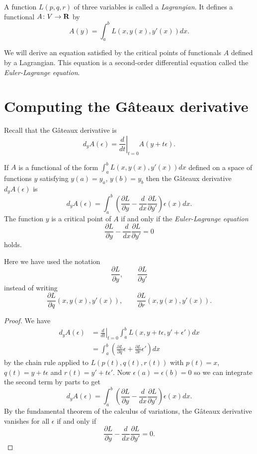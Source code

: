 \begin{dfn}
A function $L(p,q,r)$ of three variables is called a {\em Lagrangian}. It defines a functional $A\colon V\to\mathbf{R}$ by
\[A(y)=\int_a^bL(x,y(x),y'(x))dx.\]
\end{dfn}

We will derive an equation satisfied by the critical points of functionals $A$ defined by a Lagrangian. This equation is a second-order differential equation called the {\em Euler-Lagrange equation}.

\section{Computing the G\^{a}teaux derivative}

Recall that the G\^{a}teaux derivative is
\[d_yA(\epsilon)=\left.\frac{d}{dt}\right|_{t=0}A(y+t\epsilon).\]
\begin{thm}
If $A$ is a functional of the form $\int_a^bL(x,y(x),y'(x))dx$ defined on a space of functions $y$ satisfying $y(a)=y_a$, $y(b)=y_b$ then the G\^{a}teaux derivative $d_yA(\epsilon)$ is
\[d_yA(\epsilon)=\int_a^b\left(\frac{\partial L}{\partial y}-\frac{d}{dx}\frac{\partial L}{\partial y'}\right)\epsilon(x)dx.\]
The function $y$ is a critical point of $A$ if and only if the {\em Euler-Lagrange equation}
\[\frac{\partial L}{\partial y}-\frac{d}{dx}\frac{\partial L}{\partial y'}=0\]
holds.
\end{thm}
\begin{rmk}
Here we have used the notation
\[\frac{\partial L}{\partial y},\qquad\frac{\partial L}{\partial y'}\]
instead of writing
\[\frac{\partial L}{\partial q}(x,y(x),y'(x)),\qquad\frac{\partial L}{\partial r}(x,y(x),y'(x)).\]
\end{rmk}
\begin{proof}
We have
\begin{align*}
d_yA(\epsilon)&=\left.\frac{d}{dt}\right|_{t=0}\int_a^bL\left(x,y+t\epsilon,y'+\epsilon'\right)dx\\
&=\int_a^b\left(\frac{\partial L}{\partial q}\epsilon+\frac{\partial L}{\partial r}\epsilon'\right)dx
\end{align*}
by the chain rule applied to $L(p(t),q(t),r(t))$ with $p(t)=x$, $q(t)=y+t\epsilon$ and $r(t)=y'+t\epsilon'$. Now $\epsilon(a)=\epsilon(b)=0$ so we can integrate the second term by parts to get
\[d_yA(\epsilon)=\int_a^b\left(\frac{\partial L}{\partial y}-\frac{d}{dx}\frac{\partial L}{\partial y'}\right)\epsilon(x)dx.\]
By the fundamental theorem of the calculus of variations, the G\^{a}teaux derivative vanishes for all $\epsilon$ if and only if
\[\frac{\partial L}{\partial y}-\frac{d}{dx}\frac{\partial L}{\partial y'}=0.\]
\end{proof}

